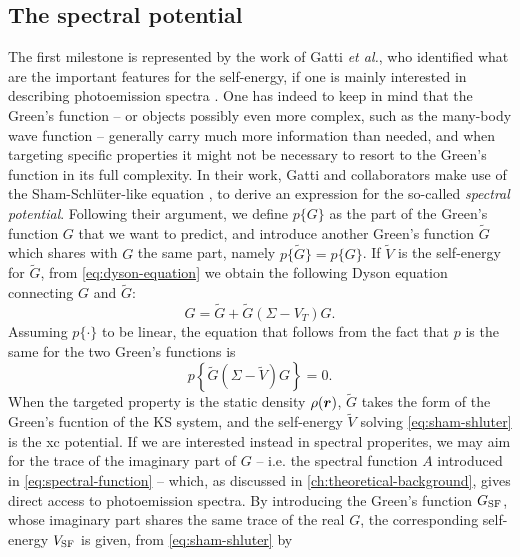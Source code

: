 \subsection{The spectral potential\label{sec:spectral-potential}}
The first milestone is represented by the work of Gatti \emph{et al.}, who identified what are the important features for the self-energy, if one is mainly interested in describing photoemission spectra \cite{gatti_transforming_2007}. One has indeed to keep in mind that the Green's function -- or objects possibly even more complex, such as the many-body wave function -- generally carry much more information than needed, and when targeting specific properties it might not be necessary to resort to the Green's function in its full complexity. In their work, Gatti and collaborators make use of the Sham-Schl\"{u}ter-like equation \cite{sham_density-functional_1983}, to derive an expression for the so-called \emph{spectral potential}. Following their argument, we define $p\{ G \}$ as the part of the Green's function $G$ that we want to predict, and introduce another Green's function $\tilde{G}$ which shares with $G$ the same part, namely $p\{ \tilde{G} \} = p\{ G \}$. If $\tilde{V}$ is the self-energy for $\tilde{G}$, from \cref{eq:dyson-equation} we obtain the following Dyson equation connecting $G$ and $\tilde{G}$:
%
\begin{equation}
    G = \tilde{G} + \tilde{G}\left( \Sigma - V_T \right) G .
    \label{eq:dyson-property-p}
\end{equation}
%
Assuming $p\{ \cdot \}$ to be linear, the equation that follows from the fact that $p$ is the same for the two Green's functions is
%
\begin{equation}
    p \left\{ \tilde{G} \left( \Sigma - \tilde{V} \right) G \right\} = 0 .
    \label{eq:sham-shluter}
\end{equation}
%
When the targeted property is the static density $\rho({\bm r})$, $\tilde{G}$ takes the form of the Green's fucntion of the KS system, and the self-energy $\tilde{V}$ solving \cref{eq:sham-shluter} is the xc potential. If we are interested instead in spectral properites, we may aim for the trace of the imaginary part of $G$ -- i.e. the spectral function $A$ introduced in \cref{eq:spectral-function} -- which, as discussed in \cref{ch:theoretical-background}, gives direct access to photoemission spectra. By introducing the Green's function $G_{\rm SF}$, whose imaginary part shares the same trace of the real $G$, the corresponding self-energy $V_{\rm SF}$ is given, from \cref{eq:sham-shluter} by
